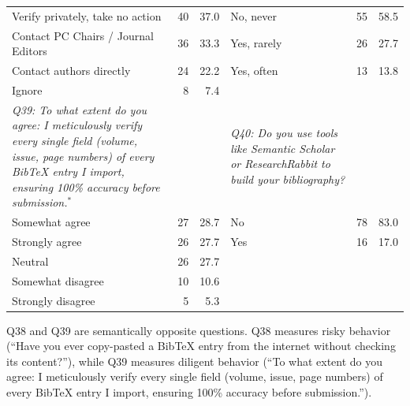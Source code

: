 \begin{table}[htbp]
\begin{threeparttable}
\begin{tabular}{p{6cm}rr|p{6cm}rr}
\rowcolor{tableRowLight}
Verify privately, take no action & 40 & 37.0 & No, never & 55 & 58.5 \\
Contact PC Chairs / Journal Editors & 36 & 33.3 & Yes, rarely & 26 & 27.7 \\
\rowcolor{tableRowLight}
Contact authors directly & 24 & 22.2 & Yes, often & 13 & 13.8 \\
Ignore & 8 & 7.4 &  &  &  \\
\midrule
\textit{Q39: To what extent do you agree: I meticulously verify every single field (volume, issue, page numbers) of every BibTeX entry I import, ensuring 100\% accuracy before submission.}$^*$ & & & \textit{Q40: Do you use tools like Semantic Scholar or ResearchRabbit to build your bibliography?} & & \\
\rowcolor{tableRowLight}
Somewhat agree & 27 & 28.7 & No & 78 & 83.0 \\
Strongly agree & 26 & 27.7 & Yes & 16 & 17.0 \\
\rowcolor{tableRowLight}
Neutral & 26 & 27.7 &  &  &  \\
Somewhat disagree & 10 & 10.6 &  &  &  \\
\rowcolor{tableRowLight}
Strongly disagree & 5 & 5.3 &  &  &  \\
\bottomrule
    \end{tabular}
    \begin{tablenotes}
      \footnotesize
      \item Q38 and Q39 are semantically opposite questions. Q38 measures risky behavior (``Have you ever copy-pasted a BibTeX entry from the internet without checking its content?''), while Q39 measures diligent behavior (``To what extent do you agree: I meticulously verify every single field (volume, issue, page numbers) of every BibTeX entry I import, ensuring 100\% accuracy before submission.'').
    \end{tablenotes}
  \end{threeparttable}
\end{table}

